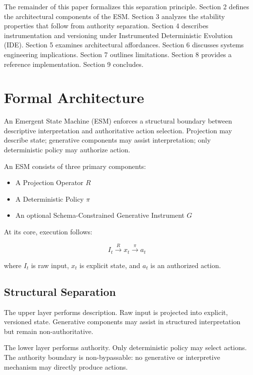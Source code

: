 \documentclass[11pt]{article}
\begin{document}
The remainder of this paper formalizes this separation principle. Section 2 defines the architectural components of the ESM. Section 3 analyzes the stability properties that follow from authority separation. Section 4 describes instrumentation and versioning under Instrumented Deterministic Evolution (IDE). Section 5 examines architectural affordances. Section 6 discusses systems engineering implications. Section 7 outlines limitations. Section 8 provides a reference implementation. Section 9 concludes.


\section{Formal Architecture}
An Emergent State Machine (ESM) enforces a structural boundary between descriptive interpretation and authoritative action selection. Projection may describe state; generative components may assist interpretation; only deterministic policy may authorize action.

An ESM consists of three primary components:

\begin{itemize}
  \item A Projection Operator $R$
  \item A Deterministic Policy $\pi$
  \item An optional Schema-Constrained Generative Instrument $G$
\end{itemize}

At its core, execution follows:

\[
I_t \xrightarrow{R} x_t \xrightarrow{\pi} a_t
\]


where $I_t$ is raw input, $x_t$ is explicit state, and $a_t$ is an authorized action.

\subsection{Structural Separation}

The upper layer performs description. Raw input is projected into explicit, versioned state. Generative components may assist in structured interpretation but remain non-authoritative.

The lower layer performs authority. Only deterministic policy may select actions. The authority boundary is non-bypassable: no generative or interpretive mechanism may directly produce actions.
\end{document}
